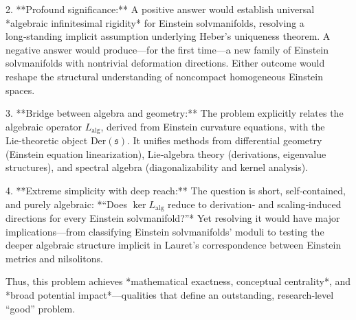 2. **Profound significance:**  
   A positive answer would establish universal *algebraic infinitesimal rigidity* for Einstein solvmanifolds, resolving a long‑standing implicit assumption underlying Heber’s uniqueness theorem.  
   A negative answer would produce—for the first time—a new family of Einstein solvmanifolds with nontrivial deformation directions. Either outcome would reshape the structural understanding of noncompact homogeneous Einstein spaces.

3. **Bridge between algebra and geometry:**  
   The problem explicitly relates the algebraic operator \(L_{\mathrm{alg}}\), derived from Einstein curvature equations, with the Lie‑theoretic object \(\mathrm{Der}(\mathfrak{s})\).  It unifies methods from differential geometry (Einstein equation linearization), Lie‑algebra theory (derivations, eigenvalue structures), and spectral algebra (diagonalizability and kernel analysis).  

4. **Extreme simplicity with deep reach:**  
   The question is short, self‑contained, and purely algebraic:  
   *“Does \( \ker L_{\mathrm{alg}} \) reduce to derivation‑ and scaling‑induced directions for every Einstein solvmanifold?”*  
   Yet resolving it would have major implications—from classifying Einstein solvmanifolds’ moduli to testing the deeper algebraic structure implicit in Lauret’s correspondence between Einstein metrics and nilsolitons.

Thus, this problem achieves *mathematical exactness, conceptual centrality*, and *broad potential impact*—qualities that define an outstanding, research‑level “good” problem.